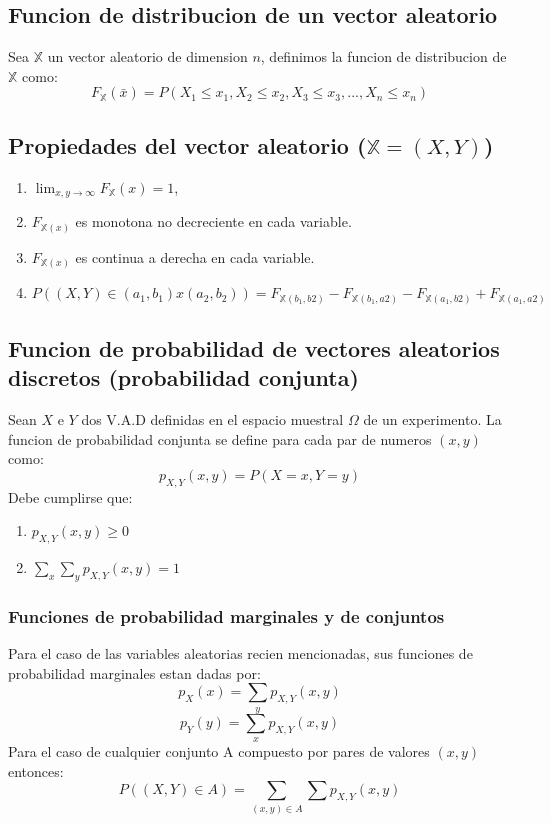 \documentclass[titlepage,a4paper]{article}
\begin{document}
\subsection{Funcion de distribucion de un vector aleatorio}
Sea $\mathbb{X}$ un vector aleatorio de dimension $n$, definimos la funcion de distribucion de $\mathbb{X}$ como:
\begin{equation*}
    F_{\mathbb{X}}(\bar{x}) = P(X_{1} \leq x_{1},X_{2} \leq x_{2}, X_{3} \leq x_{3},..., X_{n} \leq x_{n})
\end{equation*}

\subsection{Propiedades del vector aleatorio ($\mathbb{X} = (X,Y)$)}
\begin{enumerate}
    \item $\lim_{x,y \to \infty} F_{\mathbb{X}}(x) =1$,
    \item $ F_{\mathbb{X} (x)}$ es monotona no decreciente en cada variable.
    \item $ F_{\mathbb{X} (x)}$ es continua a derecha en cada variable.
    \item $ P((X,Y) \in (a_{1},b_{1})x(a_{2},b_{2})) = F_{\mathbb{X}(b_{1},b{2})} - F_{\mathbb{X}(b_{1},a{2})} -F_{\mathbb{X}(a_{1},b{2})} + F_{\mathbb{X}(a_{1},a{2})}$ 
\end{enumerate}

\subsection{Funcion de probabilidad de vectores aleatorios discretos (probabilidad conjunta)}
Sean $X$ e $Y$ dos V.A.D definidas en el espacio muestral $\Omega$ de un experimento.
La funcion de probabilidad conjunta se define para cada par de numeros $(x,y)$ como:
\begin{equation*}
    p_{X,Y}(x,y) = P(X = x, Y = y)
\end{equation*}
Debe cumplirse que:
\begin{enumerate}
    \item $ p_{X,Y}(x,y) \geq 0 $
    \item $ \sum_{x} \sum_{y} p_{X,Y}(x,y) = 1 $
\end{enumerate}

\subsubsection{Funciones de probabilidad marginales y de conjuntos}
Para el caso de las variables aleatorias recien mencionadas, sus funciones de probabilidad
marginales estan dadas por:
\begin{equation*}
    p_{X}(x) = \sum_{y} p_{X,Y}(x,y)
\end{equation*}
\begin{equation*}
    p_{Y}(y) = \sum_{x} p_{X,Y}(x,y)
\end{equation*}
Para el caso de cualquier conjunto A compuesto por pares de valores $(x,y)$ entonces:
\begin{equation*}
    P((X,Y) \in A) = \sum_{(x,y) \in A}\sum  p_{X,Y}(x,y)
\end{equation*} 
\end{document}
